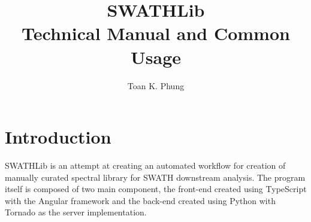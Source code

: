 \documentclass[10pt,a4paper]{memoir}
\title{%
SWATHLib \\
\large Technical Manual and Common Usage}
\author{Toan K. Phung}
\begin{document}
\maketitle
\tableofcontents
\section{Introduction}
SWATHLib is an attempt at creating an automated workflow for creation of manually curated spectral library for SWATH downstream analysis. The program itself is composed of two main component, the front-end created using TypeScript with the Angular framework and the back-end created using Python with Tornado as the server implementation.
\end{document}

